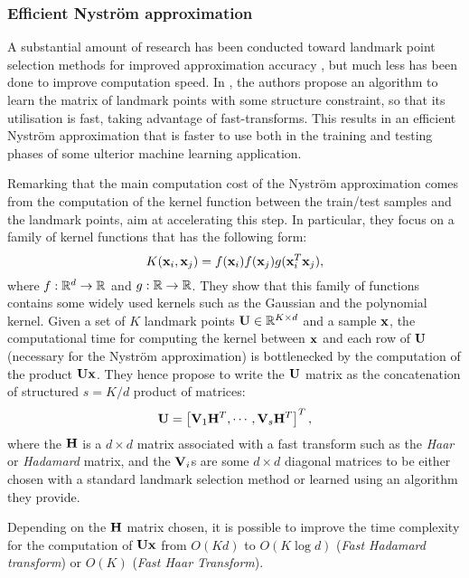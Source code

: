 \subsubsection{Efficient Nyström approximation}

A substantial amount of research has been conducted toward landmark point selection methods for improved approximation accuracy \cite{kumar2012sampling} \cite{musco2017recursive}, but much less has been done to improve computation speed. In \cite{si2016computationally}, the authors propose an algorithm to learn the matrix of landmark points with some structure constraint, so that its utilisation is fast, taking advantage of fast-transforms. This results in an efficient Nyström approximation that is faster to use both in the training and testing phases of some ulterior machine learning application.

Remarking that the main computation cost of the Nyström approximation comes from the computation of the kernel function between the train/test samples and the landmark points, \cite{si2016computationally} aim at accelerating this step. In particular, they focus on a family of kernel functions that has the following form:
%
\begin{equation}
 K({\mathbf{x}}_i, {\mathbf{x}}_j) = f({\mathbf{x}}_i) f({\mathbf{x}}_j) g({\mathbf{x}}_i^T{\mathbf{x}}_j),
\end{equation}
%
where $f: \mathbb{R}^d \rightarrow \mathbb{R}$ and $g: \mathbb{R} \rightarrow \mathbb{R}$. They show that this family of functions contains some widely used kernels such as the Gaussian and the polynomial kernel. Given a set of $K$ landmark points ${\mathbf{U}} \in \mathbb{R}^{K \times d}$ and a sample ${\mathbf{x}}$, the computational time for computing the kernel between ${\mathbf{x}}$ and each row of ${\mathbf{U}}$ (necessary for the Nyström approximation) is bottlenecked by the computation of the product ${\mathbf{U}}{\mathbf{x}}$. They hence propose to write the ${\mathbf{U}}$ matrix as the concatenation of structured $s = K / d$ product of matrices:
%
\begin{equation}
 {\mathbf{U}} = \left[ {\mathbf{V}}_1 {\mathbf{H}}^T, \cdots, {\mathbf{V}}_s{\mathbf{H}}^T  \right]^T,
\end{equation}
%
where the ${\mathbf{H}}$ is a $d \times d$ matrix associated with a fast transform such as the \textit{Haar} or \textit{Hadamard} matrix, and the ${\mathbf{V}}_i$s are some $d \times d$ diagonal matrices to be either chosen with a standard landmark selection method or learned using an algorithm they provide.

Depending on the ${\mathbf{H}}$ matrix chosen, it is possible to improve the time complexity for the computation of ${\mathbf{U}}{\mathbf{x}}$ from $O(Kd)$ to $O(K \log{d})$ (\textit{Fast Hadamard transform}) or $O(K)$ (\textit{Fast Haar Transform}).

